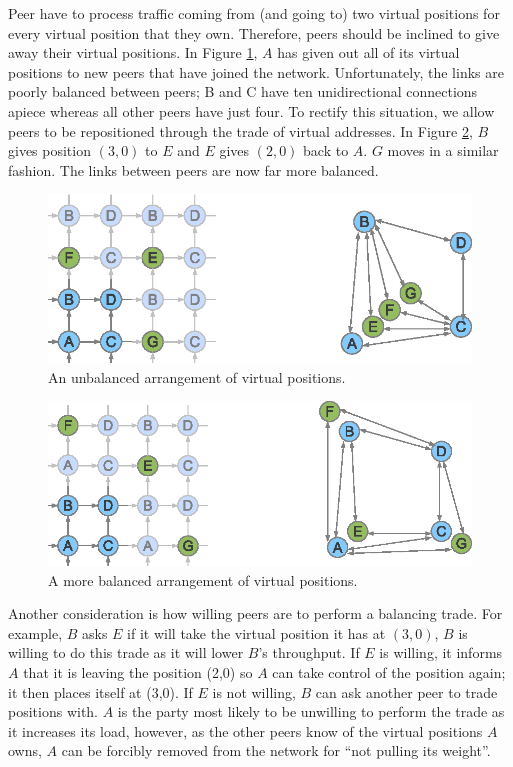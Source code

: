 \documentclass[ %
                    author={Luke Murray},
                supervisor={Dr. Simon Hollis},
                     title={Shadow Peer-to-Peer Networks},
                  subtitle={},
                    degree={MEng},
                      year={2013} ]{thesis}
\begin{document}
Peer have to process traffic coming from (and going to) two virtual positions for every virtual position that they own. Therefore, peers should be inclined to give away their virtual positions. In Figure \ref{balance1}, $A$ has given out all of its virtual positions to new peers that have joined the network. Unfortunately, the links are poorly balanced between peers; B and C have ten unidirectional connections apiece whereas all other peers have just four. To rectify this situation, we allow peers to be repositioned through the trade of virtual addresses. In Figure \ref{balance2}, $B$ gives position $(3,0)$ to $E$ and $E$ gives $(2,0)$ back to $A$. $G$ moves in a similar fashion. The links between peers are now far more balanced. 

\begin{figure}[h]
    \centering
    \includegraphics{diagrams/network_balance1.eps}
    \caption{An unbalanced arrangement of virtual positions.}
    \label{balance1}
\end{figure}
\begin{figure}[h]
    \centering
    \includegraphics{diagrams/network_balance2.eps}
    \caption{A more balanced arrangement of virtual positions.}
    \label{balance2}
\end{figure}

Another consideration is how willing peers are to perform a balancing trade. For example, $B$ asks $E$ if it will take the virtual position it has at $(3,0)$, $B$ is willing to do this trade as it will lower $B$'s throughput. If $E$ is willing, it informs $A$ that it is leaving the position (2,0) so $A$ can take control of the position again; it then places itself at (3,0). If $E$ is not willing, $B$ can ask another peer to trade positions with. $A$ is the party most likely to be unwilling to perform the trade as it increases its load, however, as the other peers know of the virtual positions $A$ owns, $A$ can be forcibly removed from the network for ``not pulling its weight''.
\end{document}
